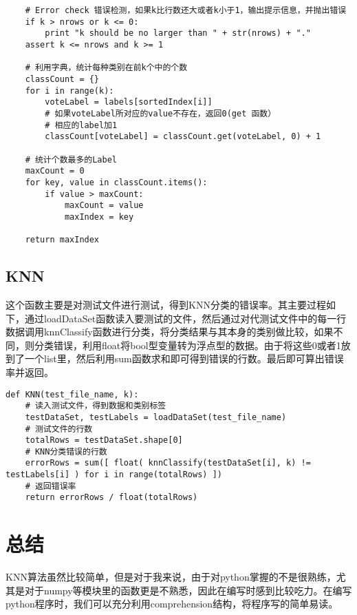 \documentclass[a4paper, 1pt]{article}
\begin{document}
\begin{spacing}{1.0}
\begin{lstlisting}
    # Error check 错误检测，如果k比行数还大或者k小于1，输出提示信息，并抛出错误 
    if k > nrows or k <= 0:
        print "k should be no larger than " + str(nrows) + "."
    assert k <= nrows and k >= 1
    
    # 利用字典，统计每种类别在前k个中的个数
    classCount = {}
    for i in range(k):
        voteLabel = labels[sortedIndex[i]]
        # 如果voteLabel所对应的value不存在，返回0(get 函数）
        # 相应的label加1
        classCount[voteLabel] = classCount.get(voteLabel, 0) + 1

    # 统计个数最多的Label
    maxCount = 0
    for key, value in classCount.items():
        if value > maxCount:
            maxCount = value
            maxIndex = key

    return maxIndex
\end{lstlisting}


\subsection{KNN}
 这个函数主要是对测试文件进行测试，得到KNN分类的错误率。其主要过程如下，通过loadDataSet函数读入要测试的文件，然后通过对代测试文件中的每一行数据调用knnClassify函数进行分类，将分类结果与其本身的类别做比较，如果不同，则分类错误，利用float将bool型变量转为浮点型的数据。由于将这些0或者1放到了一个list里，然后利用sum函数求和即可得到错误的行数。最后即可算出错误率并返回。
\begin{lstlisting}
def KNN(test_file_name, k):
    # 读入测试文件，得到数据和类别标签 
    testDataSet, testLabels = loadDataSet(test_file_name)
    # 测试文件的行数
    totalRows = testDataSet.shape[0]
    # KNN分类错误的行数
    errorRows = sum([ float( knnClassify(testDataSet[i], k) != testLabels[i] ) for i in range(totalRows) ])
    # 返回错误率
    return errorRows / float(totalRows)
\end{lstlisting}

\section{总结}
KNN算法虽然比较简单，但是对于我来说，由于对python掌握的不是很熟练，尤其是对于numpy等模块里的函数更是不熟悉，因此在编写时感到比较吃力。在编写python程序时，我们可以充分利用comprehension结构，将程序写的简单易读。
\end{spacing}
\end{document}
